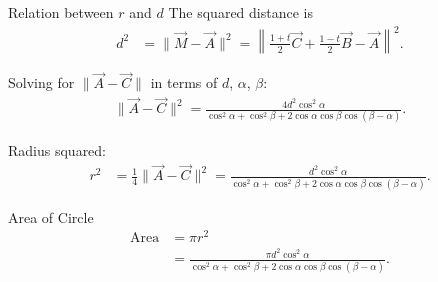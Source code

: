 \documentclass{beamer}
\begin{document}
\begin{frame}{Relation between $r$ and $d$}
The squared distance is
\begin{align}
d^2 &= \|\vec{M} - \vec{A} \|^2 = \left\| \frac{1+t}{2}\vec{C} + \frac{1-t}{2} \vec{B} - \vec{A} \right\|^2.
\end{align}

Solving for $\|\vec{A}-\vec{C}\|$ in terms of $d$, $\alpha$, $\beta$:
\begin{align}
\|\vec{A}-\vec{C}\|^2 
= \frac{4 d^2 \cos^2 \alpha}{\cos^2 \alpha + \cos^2 \beta + 2 \cos \alpha \cos \beta \cos(\beta - \alpha)}.
\end{align}

Radius squared:
\begin{align}
r^2 &= \frac{1}{4}\|\vec{A}-\vec{C}\|^2 
= \frac{d^2 \cos^2 \alpha}{\cos^2 \alpha + \cos^2 \beta + 2 \cos \alpha \cos \beta \cos(\beta-\alpha)}.
\end{align}
\end{frame}

\begin{frame}{Area of Circle}
\begin{align}
\text{Area} &= \pi r^2 \\
&= \frac{\pi d^2 \cos^2 \alpha}{\cos^2 \alpha + \cos^2 \beta + 2 \cos \alpha \cos \beta \cos(\beta-\alpha)}.
\end{align}

\begin{center}
\end{center}
\end{frame}
\end{document}
